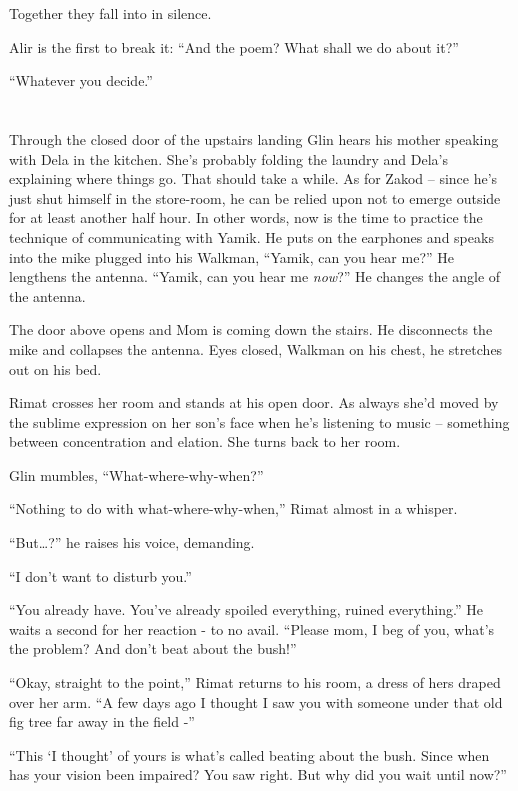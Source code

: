 \documentclass[twoside,11pt]{book}
\begin{document}
Together they fall into in silence.

Alir is the first to break it: ``And the poem? What shall we do about it?''

``Whatever you decide.''


\bigskip

\chapter{}

Through the closed door of the upstairs landing Glin hears his mother speaking with Dela in the kitchen. She's
probably folding the laundry and Dela's explaining where things go. That should take a while. As for Zakod -- since
he's just shut himself in the store-room, he can be relied upon not to emerge outside for at least another half
hour. In other words, now is the time to practice the technique of communicating with Yamik. He puts on the earphones
and speaks into the mike plugged into his Walkman, ``Yamik, can you hear me?'' He lengthens
the antenna. ``Yamik, can you hear me \textit{now}?'' He changes the angle of the antenna.

The door above opens and Mom is coming down the stairs. He disconnects the mike and collapses the
antenna. Eyes closed, Walkman on his chest, he stretches out on his bed.

Rimat crosses her room and stands at his open door. As always she'd moved by the sublime expression on her son's face
when he's listening to music -- something between concentration and elation. She turns back to her room.

Glin mumbles, ``What-where-why-when?''

``Nothing to do with what-where-why-when,'' Rimat almost in a whisper.

``But{\dots}?'' he raises his voice, demanding.

``I don't want to disturb you.''

``You already have. You've already spoiled everything, ruined everything.'' He waits a second
for her reaction - to no avail. ``Please mom, I beg of you, what's the problem? And don't beat about
the bush!''

``Okay, straight to the point,'' Rimat returns to his room, a dress of hers draped over her
arm. ``A few days ago I thought I saw you with someone under that old fig tree far away in the field
-''

``This `I thought' of yours is what's called beating about the bush. Since when has your vision been
impaired? You saw right. But why did you wait until now?''
\end{document}
